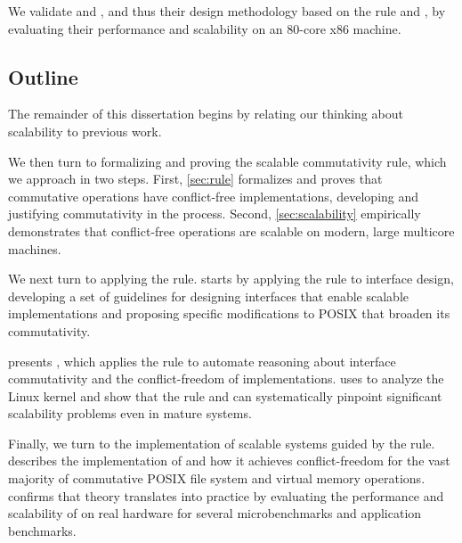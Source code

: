 We validate \vm and \fs, and thus their design methodology based on
the rule and \tool, by evaluating their performance and scalability on
an 80-core x86 machine.


\subsection{Outline}

The remainder of this dissertation begins by relating our thinking
about scalability to previous work.

We then turn to formalizing and proving the scalable commutativity
rule, which we approach in two steps.  First, \cref{sec:rule}
formalizes and proves that commutative operations have conflict-free
implementations, developing and justifying \SIM commutativity in the
process.  Second, \cref{sec:scalability} empirically demonstrates that
conflict-free operations are scalable on modern, large multicore
machines.

We next turn to applying the rule.   starts by
applying the rule to interface design, developing a set of guidelines
for designing interfaces that enable scalable implementations and
proposing specific modifications to POSIX that broaden its
commutativity.

 presents \tool, which applies the rule to automate
reasoning about interface commutativity and the conflict-freedom of
implementations.   uses \tool to analyze the Linux
kernel and show that the rule and \tool can systematically pinpoint
significant scalability problems even in mature systems.

Finally, we turn to the implementation of scalable systems guided by
the rule.   describes the implementation of \sys and how
it achieves conflict-freedom for the vast majority of commutative
POSIX file system and virtual memory operations.  
confirms that theory translates into practice by evaluating the
performance and scalability of \sys on real hardware for several
microbenchmarks and application benchmarks.



